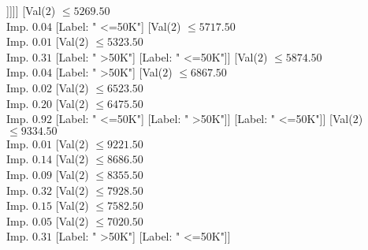 \documentclass[margin=10pt]{standalone}
\begin{document}
\begin{forest}
															[Val($2$) $ \leq 3770.50$ \\ Imp. $0.02$
																[Label: " <=50K"]
																[Val($2$) $ \leq 4889.50$ \\ Imp. $0.01$
																	[Val($2$) $ \leq 3986.50$ \\ Imp. $0.08$
																		[Label: " <=50K"]
																		[Val($2$) $ \leq 4367.50$ \\ Imp. $0.18$
																			[Label: " >50K"]
																			[Val($2$) $ \leq 4554.50$ \\ Imp. $0.09$
																				[Label: " <=50K"]
																				[Val($2$) $ \leq 4569.50$ \\ Imp. $0.17$
																					[Label: " >50K"]
																					[Label: " <=50K"]]]]]
																	[Val($2$) $ \leq 5269.50$ \\ Imp. $0.04$
																		[Label: " <=50K"]
																		[Val($2$) $ \leq 5717.50$ \\ Imp. $0.01$
																			[Val($2$) $ \leq 5323.50$ \\ Imp. $0.31$
																				[Label: " >50K"]
																				[Label: " <=50K"]]
																			[Val($2$) $ \leq 5874.50$ \\ Imp. $0.04$
																				[Label: " >50K"]
																				[Val($2$) $ \leq 6867.50$ \\ Imp. $0.02$
																					[Val($2$) $ \leq 6523.50$ \\ Imp. $0.20$
																						[Val($2$) $ \leq 6475.50$ \\ Imp. $0.92$
																							[Label: " <=50K"]
																							[Label: " >50K"]]
																						[Label: " <=50K"]]
																					[Val($2$) $ \leq 9334.50$ \\ Imp. $0.01$
																						[Val($2$) $ \leq 9221.50$ \\ Imp. $0.14$
																							[Val($2$) $ \leq 8686.50$ \\ Imp. $0.09$
																								[Val($2$) $ \leq 8355.50$ \\ Imp. $0.32$
																									[Val($2$) $ \leq 7928.50$ \\ Imp. $0.15$
																										[Val($2$) $ \leq 7582.50$ \\ Imp. $0.05$
																											[Val($2$) $ \leq 7020.50$ \\ Imp. $0.31$
																												[Label: " >50K"]
																												[Label: " <=50K"]]

\end{forest}
\end{document}
